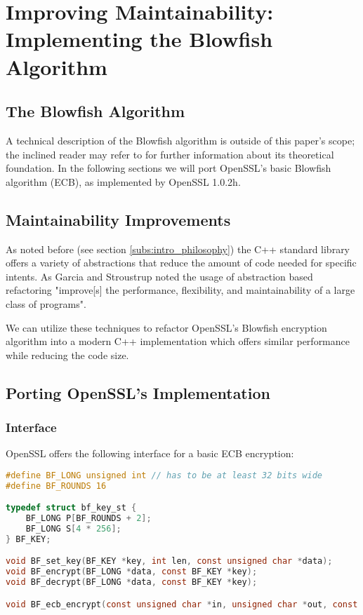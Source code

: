 \section{Improving Maintainability: Implementing the Blowfish Algorithm}

\subsection{The Blowfish Algorithm}

A technical description of the Blowfish algorithm is outside of this paper's scope; the inclined reader may refer to \cite{blowfish} for further information about its theoretical foundation. In the following sections we will port OpenSSL's basic Blowfish algorithm (ECB), as implemented by OpenSSL 1.0.2h.

\subsection{Maintainability Improvements}

As noted before (see section \ref{subs:intro_philosophy}) the C++ standard library offers a variety of abstractions that reduce the amount of code needed for specific intents. As Garcia and Stroustrup noted the usage of abstraction based refactoring "improve[s] the performance, flexibility, and maintainability of a large class of programs"\cite{impperf}.

We can utilize these techniques to refactor OpenSSL's Blowfish encryption algorithm into a modern C++ implementation which offers similar performance while reducing the code size.

\subsection{Porting OpenSSL's Implementation}

\subsubsection{Interface}\label{subsub:bf_interface}

OpenSSL offers the following interface for a basic ECB encryption:

\begin{lstlisting}[language=C]
#define BF_LONG unsigned int // has to be at least 32 bits wide
#define BF_ROUNDS 16

typedef struct bf_key_st {
    BF_LONG P[BF_ROUNDS + 2];
    BF_LONG S[4 * 256];
} BF_KEY;

void BF_set_key(BF_KEY *key, int len, const unsigned char *data);
void BF_encrypt(BF_LONG *data, const BF_KEY *key);
void BF_decrypt(BF_LONG *data, const BF_KEY *key);

void BF_ecb_encrypt(const unsigned char *in, unsigned char *out, const BF_KEY *key, int enc);
\end{lstlisting}

